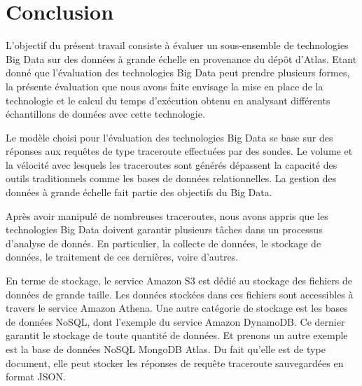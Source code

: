\chapter*{Conclusion}

L'objectif du présent travail consiste à évaluer un sous-ensemble de technologies Big Data sur des données à grande échelle en provenance du dépôt d'Atlas. Etant donné que l'évaluation des technologies Big Data peut prendre plusieurs formes, la présente évaluation que nous avons faite envisage 
 la mise en place de la technologie  et   le calcul du temps d'exécution obtenu en analysant différents échantillons de données avec cette technologie.
 
 Le modèle choisi pour l'évaluation des technologies Big Data se base sur des réponses aux requêtes de type traceroute effectuées par des sondes.  Le volume et la vélocité  avec lesquels les traceroutes  sont générés dépassent la capacité des outils traditionnels comme les bases de données relationnelles. La gestion des données à grande échelle  fait partie des objectifs du Big Data.







 
Après avoir manipulé de nombreuses traceroutes, nous avons appris que les technologies Big Data doivent garantir plusieurs tâches dans un processus d'analyse de donnés. En particulier, la collecte de données, le stockage de données, le traitement de ces dernières, voire d'autres.

 En terme de stockage,   le service Amazon S3 est dédié au stockage des fichiers de données de grande taille. Les données stockées dans ces fichiers sont accessibles à travers le service Amazon Athena. 
  Une autre catégorie de stockage est  les bases de données NoSQL, dont l'exemple  du service Amazon DynamoDB. Ce dernier   garantit le stockage de toute quantité de données. Et prenons un autre exemple est la base   de données NoSQL   MongoDB Atlas. Du fait qu'elle est de type document, elle peut stocker les réponses de requête traceroute sauvegardées en format JSON.  
  
